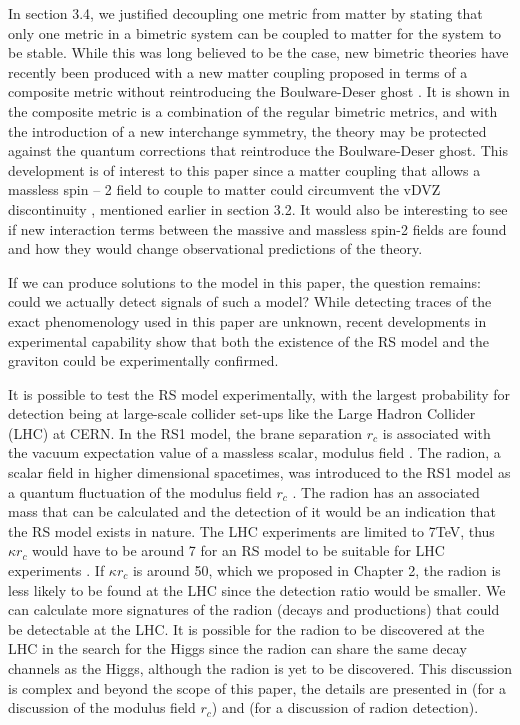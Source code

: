 \documentclass[11pt]{report}
\numberwithin{equation}{chapter}
\begin{document}
In section 3.4, we justified decoupling one metric from matter by stating that only one metric in a bimetric system can be coupled to matter for the system to be stable. While this was long believed to be the case, new bimetric theories have recently been produced with a new matter coupling proposed in terms of a composite metric without reintroducing the Boulware-Deser ghost \cite{hassan2014absence}. It is shown in \cite{hassan2014absence} the composite metric is a combination of the regular bimetric metrics, and with the introduction of a new interchange symmetry, the theory may be protected against the quantum corrections that reintroduce the Boulware-Deser ghost. This development is of interest to this paper since a matter coupling that allows a massless spin – 2 field to couple to matter could circumvent the vDVZ discontinuity \cite{vanDam:1970vg} \cite{Zakharov:1970cc}, mentioned earlier in section 3.2. It would also be interesting to see if new interaction terms between the massive and massless spin-2 fields are found and how they would change observational predictions of the theory.

If we can produce solutions to the model in this paper, the question remains: could we actually detect signals of such a model? While detecting traces of the exact phenomenology used in this paper are unknown, recent developments in experimental capability show that both the existence of the RS model and the graviton could be experimentally confirmed. 

It is possible to test the RS model experimentally, with the largest probability for detection being at large-scale collider set-ups like the Large Hadron Collider (LHC) at CERN. In the RS1 model, the brane separation $r_c$ is associated with the vacuum expectation value of a massless scalar, modulus field \cite{Goldberger_1999}. The radion, a scalar field in higher dimensional spacetimes, was introduced to the RS1 model as a quantum fluctuation of the modulus field $r_c$ \cite{Barger_2012}. The radion has an associated mass that can be calculated and the detection of it would be an indication that the RS model exists in nature. The LHC experiments are limited to 7TeV, thus $\kappa r_c$ would have to be around 7 for an RS model to be suitable for LHC experiments \cite{Barger_2012}. If $\kappa r_c$ is around 50, which we proposed in Chapter 2, the radion is less likely to be found at the LHC since the detection ratio would be smaller. We can calculate more signatures of the radion (decays and productions) that could be detectable at the LHC. It is possible for the radion to be discovered at the LHC in the search for the Higgs since the radion can share the same decay channels as the Higgs, although the radion is yet to be discovered. This discussion is complex and beyond the scope of this paper, the details are presented in \cite{Goldberger_1999} (for a discussion of the modulus field $r_c$) and \cite{Barger_2012} (for a discussion of radion detection).
\end{document}
